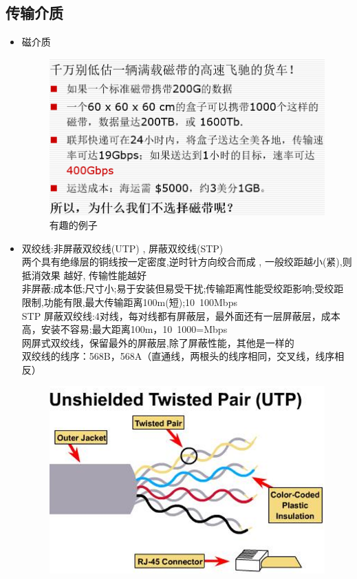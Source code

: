 \documentclass[UTF8,a4paper]{ctexart}
\begin{document}
  \subsection{传输介质}
  \begin{itemize}
    \item 磁介质
    \begin{figure}[H]
      \centering
      \includegraphics[scale = 0.3]{assets/jisuanjiwangluo_080be.png}
      \caption{有趣的例子}
    \end{figure}
    \item 双绞线:非屏蔽双绞线(UTP) , 屏蔽双绞线(STP)\\
    两个具有绝缘层的铜线按一定密度,逆时针方向绞合而成 , 一般绞距越小(紧),则抵消效果
    越好, 传输性能越好 \\
    非屏蔽:成本低;尺寸小;易于安装但易受干扰;传输距离性能受绞距影响;受绞距限制,功能有限,最大传输距离100m(短);10~100Mbps\\
    STP 屏蔽双绞线:4对线，每对线都有屏蔽层，最外面还有一层屏蔽层，成本高，安装不容易;最大距离100m，10~1000=Mbps\\
    网屏式双绞线，保留最外的屏蔽层,除了屏蔽性能，其他是一样的\\
    双绞线的线序：568B，568A（直通线，两根头的线序相同，交叉线，线序相反）
    \begin{figure}[H]
      \centering
      \includegraphics[scale = 0.3]{assets/jisuanjiwangluo_fa7df.png}

\end{figure}
\end{itemize}
\end{document}
